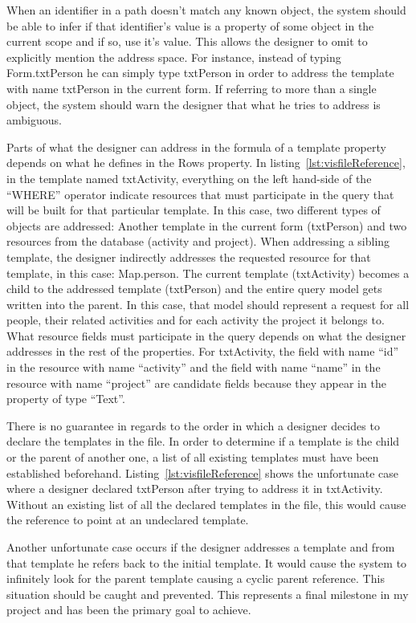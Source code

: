 When an identifier in a path doesn't match any known object, the system should be able to infer if that identifier's value is a property of some object in the current scope and if so, use it's value. This allows the designer to omit to explicitly mention the address space. For instance, instead of typing Form.txtPerson he can simply type txtPerson in order to address the template with name txtPerson in the current form. If referring to more than a single object, the system should warn the designer that what he tries to address is ambiguous.

Parts of what the designer can address in the formula of a template property depends on what he defines in the Rows property. In listing~\ref{lst:visfileReference}, in the template named txtActivity, everything on the left hand-side of the ``WHERE'' operator indicate resources that must participate in the query that will be built for that particular template. In this case, two different types of objects are addressed: Another template in the current form (txtPerson) and two resources from the database (activity and project). When addressing a sibling template, the designer indirectly addresses the requested resource for that template, in this case: Map.person. The current template (txtActivity) becomes a child to the addressed template (txtPerson) and the entire query model gets written into the parent. In this case, that model should represent a request for all people, their related activities and for each activity the project it belongs to. What resource fields must participate in the query depends on what the designer addresses in the rest of the properties. For txtActivity, the field with name ``id'' in the resource with name ``activity'' and the field with name ``name'' in the resource with name ``project'' are candidate fields because they appear in the property of type ``Text''.

There is no guarantee in regards to the order in which a designer decides to declare the templates in the file. In order to determine if a template is the child or the parent of another one, a list of all existing templates must have been established beforehand. Listing~\ref{lst:visfileReference} shows the unfortunate case where a designer declared txtPerson after trying to address it in txtActivity. Without an existing list of all the declared templates in the file, this would cause the reference to point at an undeclared template.

Another unfortunate case occurs if the designer addresses a template and from that template he refers back to the initial template. It would cause the system to infinitely look for the parent template causing a cyclic parent reference. This situation should be caught and prevented. This represents a final milestone in my project and has been the primary goal to achieve.

